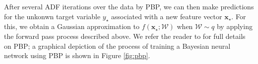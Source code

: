 After several ADF iterations over the data by PBP, we can then make predictions for the unkonwn target variable $y_\star$ associated with a new feature vector $\mathbf{x}_\star$. For this, we obtain a Gaussian approximation to $f(\mathbf{x}_\star;\mathcal{W})$ when $\mathcal{W}\sim q$ by applying the forward pass process described above. We refer the reader to \cite{hernandez2015probabilistic} for full details on PBP; a graphical depiction of the process of training a Bayesian neural network using PBP is shown in Figure \ref{fig:pbp}.
